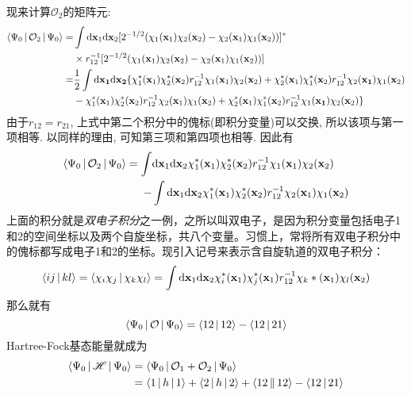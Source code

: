 
现来计算$\mathcal{O}_2$的矩阵元:
\begin{align}
\braket{\Psi_0|\mathcal{O}_2|\Psi_0}=&\int\dd\mathbf{x}_1\dd\mathbf{x}_2[2^{-1/2}(\chi_1(\mathbf{x}_1)\chi_2(\mathbf{x}_2)-\chi_2(\mathbf{x}_1)\chi_1(\mathbf{x}_2))]^*\notag\\
\qquad&\times r_{12}^{-1} [2^{-1/2}(\chi_1(\mathbf{x}_1)\chi_2(\mathbf{x}_2)-\chi_2(\mathbf{x}_1)\chi_1(\mathbf{x}_2))]\notag\\
=&\frac{1}{2}\int\dd{\mathbf{x}_1}\dd{\mathbf{x}_2}\{\chi_1^*(\mathbf{x}_1)\chi_2^*(\mathbf{x}_2)r_{12}^{-1}\chi_1(\mathbf{x}_1)\chi_2(\mathbf{x}_2) + \chi_2^*(\mathbf{x}_1)\chi_1^*(\mathbf{x}_2)r_{12}^{-1}\chi_2(\mathbf{x_1})\chi_1(\mathbf{x}_2) \notag\\
\qquad& - \chi_1^*(\mathbf{x}_1)\chi_2^*(\mathbf{x}_2)r_{12}^{-1}\chi_2(\mathbf{x}_1)\chi_1(\mathbf{x}_2) + \chi_2^*(\mathbf{x}_1)\chi_1^*(\mathbf{x}_2)r_{12}^{-1}\chi_1(\mathbf{x_1})\chi_2(\mathbf{x}_2)
\}
\end{align}
由于$r_{12}=r_{21}$, 上式中第二个积分中的傀标(即积分变量)可以交换, 所以该项与第一项相等. 以同样的理由, 可知第三项和第四项也相等. 因此有
\begin{align}
\braket{\Psi_0|\mathcal{O}_2|\Psi_0}=\int&\dd\mathbf{x}_1\dd\mathbf{x}_2 \chi_1^*(\mathbf{x}_1)\chi_2^*(\mathbf{x}_2)r_{12}^{-1}\chi_1(\mathbf{x}_1)\chi_2(\mathbf{x}_2)\notag\\
 -& \int\dd\mathbf{x}_1\dd\mathbf{x}_2\chi_1^*(\mathbf{x}_1)\chi_2^*(\mathbf{x}_2)r_{12}^{-1}\chi_2(\mathbf{x}_1)\chi_1(\mathbf{x}_2)
\end{align}
上面的积分就是\emph{双电子积分}之一例，之所以叫双电子，是因为积分变量包括电子1和2的空间坐标以及两个自旋坐标，共八个变量。习惯上，常将所有双电子积分中的傀标都写成电子1和2的坐标。现引入记号来表示含自旋轨道的双电子积分：
\begin{equation}
\braket{ij|kl}=\braket{\chi_i\chi_j|\chi_k\chi_l}=\int\dd\mathbf{x}_1\dd\mathbf{x}_2\chi_i^*(\mathbf{x}_1)\chi_j^*(\mathbf{x}_1)r_{12}^{-1}\chi_k*(\mathbf{x}_1)\chi_l(\mathbf{x}_2)
\end{equation}
那么就有
\begin{equation}
\Braket{\Psi_0|\mathcal{O}|\Psi_0}=\Braket{12|12}-\Braket{12|21}
\end{equation}
Hartree-Fock基态能量就成为
\begin{align}
\Braket{\Psi_0|\mathscr{H}|\Psi_0}&=\Braket{\Psi_0|\mathcal{O}_1+\mathcal{O}_2|\Psi_0}\notag\\
&=\Braket{1|h|1}+\Braket{2|h|2}+\Braket{12||12}-\Braket{12|21}
\end{align}

